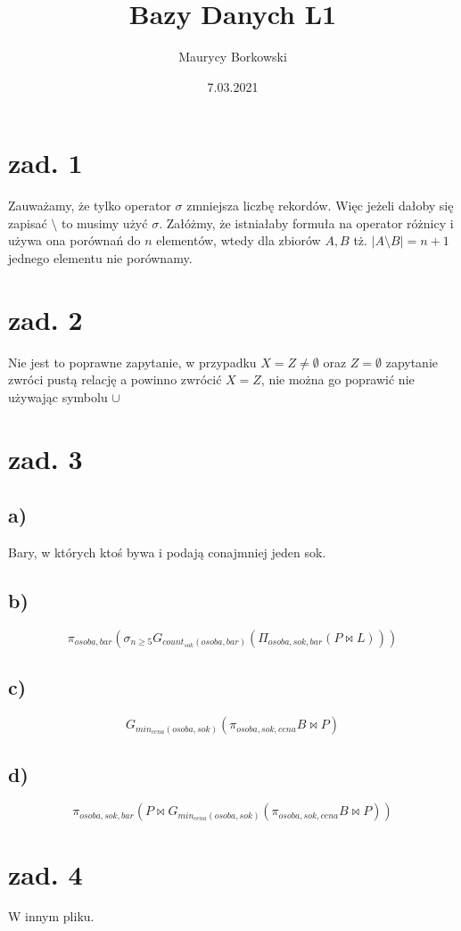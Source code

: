 \documentclass{article}
\title{Bazy Danych L1}
\date{7.03.2021}
\author{Maurycy Borkowski}
\begin{document}
\maketitle

\section{zad. 1}
Zauważamy, że tylko operator $\sigma$ zmniejsza liczbę rekordów. Więc jeżeli dałoby się zapisać $\setminus$ to musimy użyć $\sigma$. Załóżmy, że istniałaby formuła na operator różnicy i używa ona porównań do $n$ elementów, wtedy dla zbiorów $A, B$ tż. $|A \setminus B| = n+1$ jednego elementu nie porównamy.
\section{zad. 2}
Nie jest to poprawne zapytanie, w przypadku $X=Z \neq \emptyset$ oraz $Z =\emptyset$ zapytanie zwróci pustą relację a powinno zwrócić $X = Z$, nie można go poprawić nie używając symbolu $\cup$
\section{zad. 3}
\subsection*{a)}
Bary, w których ktoś bywa i podają conajmniej jeden sok.
\subsection*{b)}
$$\pi_{osoba, bar} \left (\sigma_{n \geq 5} G_{count_{sok}(osoba,bar)}(\Pi_{osoba,sok,bar}(P \bowtie L))\right)$$
\subsection*{c)}
$$
G_{min_{cena}(osoba,sok)}(\pi_{osoba,sok,cena}B \bowtie P)
$$
\subsection*{d)}
$$
\pi_{osoba,sok,bar} \left(P \bowtie G_{min_{cena}(osoba,sok)}(\pi_{osoba,sok,cena} B \bowtie P) \right)
$$
\section{zad. 4}
W innym pliku.
\end{document}
